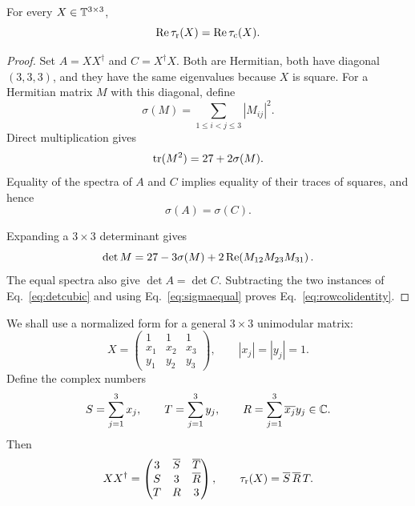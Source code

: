\begin{lemma}
\label{lem:rowcolumn}
For every $X\in\mathbb T^{3\times3}$,
\begin{equation}
\operatorname{Re}\tau_{\rm r}(X)=\operatorname{Re}\tau_{\rm c}(X).
\label{eq:rowcolidentity}
\end{equation}
\end{lemma}

\begin{proof}
Set $A=XX^{\dagger}$ and $C=X^{\dagger}X$.  Both are Hermitian, both have diagonal $(3,3,3)$, and they have the same eigenvalues because $X$ is square. For a Hermitian matrix $M$ with this diagonal, define
\begin{equation}
\sigma(M)=\sum_{1\leq i<j\leq3}|M_{ij}|^2.
\label{eq:sigmam}
\end{equation}
Direct multiplication gives
\begin{equation}
\operatorname{tr}(M^2)=27+2\sigma(M).
\label{eq:tracem2}
\end{equation}
Equality of the spectra of $A$ and $C$ implies equality of their traces of squares, and hence
\begin{equation}
\sigma(A)=\sigma(C).
\label{eq:sigmaequal}
\end{equation}

Expanding a $3\times3$ determinant gives
\begin{equation}
\det M=27-3\sigma(M)
+2\operatorname{Re}\!\left(M_{12}M_{23}M_{31}\right).
\label{eq:detcubic}
\end{equation}
The equal spectra also give $\det A=\det C$.  Subtracting the two instances of Eq.~\eqref{eq:detcubic} and using Eq.~\eqref{eq:sigmaequal} proves Eq.~\eqref{eq:rowcolidentity}.
\end{proof}

We shall use a normalized form for a general $3\times3$ unimodular matrix:
\begin{equation}
X=\begin{pmatrix}
1&1&1\\
x_1&x_2&x_3\\
y_1&y_2&y_3
\end{pmatrix},
\qquad |x_j|=|y_j|=1.
\label{eq:normalizedx}
\end{equation}
Define the complex numbers
\begin{equation}
S=\sum_{j=1}^{3}x_j,\qquad T=\sum_{j=1}^{3}y_j,\qquad
R=\sum_{j=1}^{3}\overline{x_j}y_j\in\mathbb C.
\label{eq:STR}
\end{equation}
Then
\begin{equation}
XX^{\dagger}=
\begin{pmatrix}
3&\overline S&\overline T\\
S&3&\overline R\\
T&R&3
\end{pmatrix},
\qquad
\tau_{\rm r}(X)=\overline S\,\overline R\,T.
\label{eq:gramSTR}
\end{equation}

